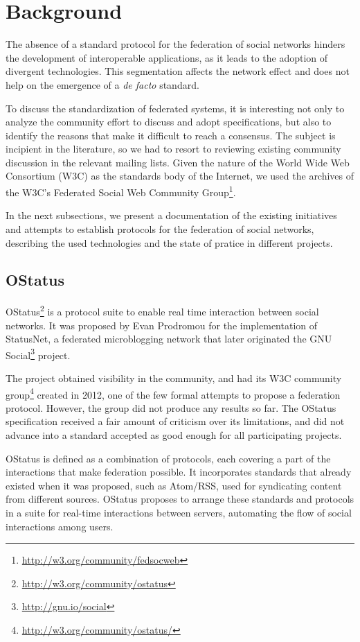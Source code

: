 \chapter{Background}
\label{chapter:2}

The absence of a standard protocol for the federation of social networks
hinders the development of interoperable applications, as it leads to
the adoption of divergent technologies. This segmentation affects the
network effect and does not help on the emergence of a \textit{de facto}
standard.

To discuss the standardization of federated systems, it is interesting not only
to analyze the community effort to discuss and adopt specifications, but also
to identify the reasons that make it difficult to reach a consensus. The
subject is incipient in the literature, so we had to resort to reviewing
existing community discussion in the relevant mailing lists. Given the nature
of the World Wide Web Consortium (W3C) as the standards body of the Internet,
we used the archives of the W3C's Federated Social Web Community
Group\footnote{\url{http://w3.org/community/fedsocweb}}.

In the next subsections, we present a documentation of the existing initiatives
and attempts to establish protocols for the federation of social networks,
describing the used technologies and the state of pratice in different
projects.


\section{OStatus}

OStatus\footnote{\url{http://w3.org/community/ostatus}} is a protocol suite to
enable real time interaction between social networks.  It was proposed by Evan
Prodromou for the implementation of StatusNet, a federated microblogging
network that later originated the GNU
Social\footnote{\url{http://gnu.io/social}} project.

The project obtained visibility in the community, and had its W3C community
group\footnote{\url{http://w3.org/community/ostatus/}} created in 2012, one of
the few formal attempts to propose a federation protocol. However, the group
did not produce any results so far. The OStatus specification received a fair
amount of criticism over its limitations, and did not advance into a standard
accepted as good enough for all participating projects.

OStatus is defined as a combination of protocols, each covering a part
of the interactions that make federation possible. It incorporates
standards that already existed when it was proposed, such as Atom/RSS,
used for syndicating content from different sources.  OStatus proposes
to arrange these standards and protocols in a suite for real-time
interactions between servers, automating the flow of social interactions
among users.

